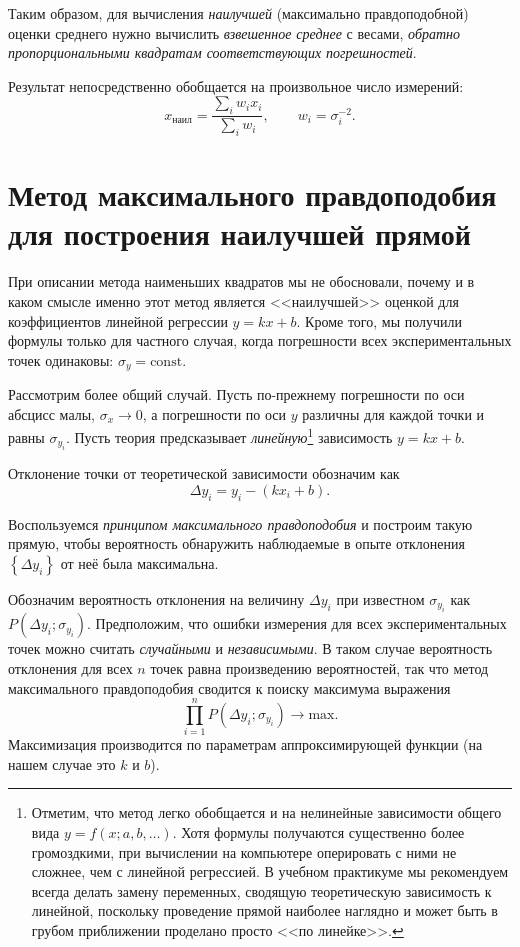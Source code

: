 Таким образом, для вычисления \emph{наилучшей} (максимально правдоподобной) оценки
среднего нужно вычислить \emph{взвешенное среднее} с весами, \emph{обратно
пропорциональными квадратам соответствующих погрешностей}.

Результат непосредственно обобщается на произвольное число измерений:
\begin{equation}
x_{\text{наил}}=\frac{\sum\limits _{i}w_{i}x_{i}}{\sum\limits _{i}w_{i}},\qquad w_{i}=\sigma_{i}^{-2}.
\end{equation}

\section{Метод максимального правдоподобия для построения наилучшей
прямой\label{subsec:MMP}}

При описании метода наименьших квадратов мы не обосновали,
почему и в каком смысле именно этот метод является <<наилучшей>>
оценкой для коэффициентов линейной регрессии $y=kx+b$. Кроме того,
мы получили формулы только для частного случая, когда погрешности
всех экспериментальных точек одинаковы: $\sigma_{y}=\mathrm{const}$.

Рассмотрим более общий случай. Пусть по-прежнему погрешности
по оси абсцисс малы, $\sigma_{x}\to0$, а погрешности по оси $y$
различны для каждой точки и равны $\sigma_{y_{i}}$. Пусть теория
предсказывает \emph{линейную}\footnote{Отметим, что метод легко обобщается и на нелинейные зависимости общего вида $y=f\left(x;a,b,\ldots\right)$. Хотя формулы
получаются существенно более громоздкими, при вычислении на компьютере
оперировать с ними не сложнее, чем с линейной регрессией. В учебном
практикуме мы рекомендуем всегда делать замену переменных, сводящую
теоретическую зависимость к линейной, поскольку проведение прямой
наиболее наглядно и может быть в грубом приближении проделано просто
<<по линейке>>.} 
зависимость $y=kx+b$.

Отклонение точки от теоретической зависимости обозначим как
\[
\Delta y_{i}=y_{i}-\left(kx_{i}+b\right).
\]

Воспользуемся \emph{принципом максимального правдоподобия}
и построим такую прямую, чтобы вероятность обнаружить наблюдаемые
в опыте отклонения $\left\{ \Delta y_{i}\right\} $ от неё была максимальна.

Обозначим вероятность отклонения на величину $\Delta y_{i}$
при известном $\sigma_{y_{i}}$ как $P\!\left(\Delta y_{i};\sigma_{y_{i}}\right)$.
Предположим, что ошибки измерения для всех экспериментальных точек
можно считать \emph{случайными} и \emph{независимыми}.
В таком случае вероятность отклонения для всех $n$ точек равна произведению
вероятностей, так что метод максимального правдоподобия сводится к
поиску максимума выражения
\begin{equation}
\prod\limits _{i=1}^{n}P\!\left(\Delta y_{i};\sigma_{y_{i}}\right)\to\mathrm{max}.\label{eq:MMP_general}
\end{equation}
Максимизация производится по параметрам аппроксимирующей функции (на
нашем случае это $k$ и $b$).

